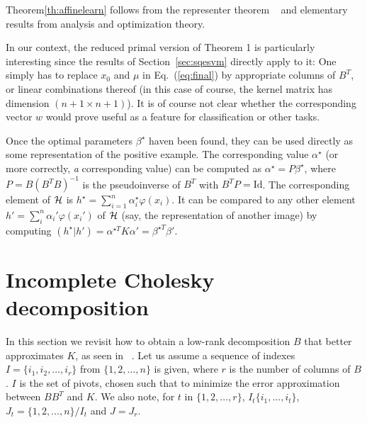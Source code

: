 \documentclass[12pt,letterpaper]{article}
\begin{document}
Theorem\ref{th:affinelearn} follows from the representer theorem
~\cite{SHS01,Wahba90} and elementary results from analysis and
optimization theory.

In our context, the reduced primal version of Theorem 1 is
particularly interesting since the results of Section~\ref{sec:sqesvm}
directly apply to it: One simply has to replace $x_0$ and $\mu$ in
Eq.~(\ref{eq:final}) by appropriate columns of $B^T$, or linear
combinations thereof (in this case of course, the kernel matrix has
dimension $(n+1\times n+1)$).  It is of course not clear whether the
corresponding vector $w$ would prove useful as a feature for
classification or other tasks.

Once the optimal parameters $\beta^\star$ haven been found, they can
be used directly as some representation of the positive example.  The
corresponding value $\alpha^\star$ (or more correctly, {\em a}
corresponding value) can be computed as $\alpha^\star =P\beta^\star$,
where $P=B(B^TB)^{-1}$ is the pseudoinverse of $B^T$ with
$B^TP=\text{Id}$. The corresponding element of $\cal H$ is
$h^\star=\sum_{i=1}^n \alpha_i^\star\varphi(x_i)$.  It can be compared
to any other element $h'=\sum_i^n\alpha_i'\varphi(x_i')$ of $\cal H$ (say, the representation of
another image) by computing $(h^\star|h')=\alpha^{\star T}K \alpha' = \beta^{\star T}\beta'$. 

\section{Incomplete Cholesky decomposition}

In this section we revisit how to obtain a low-rank decomposition $B$ that better approximates $K$, as seen in ~\cite{BaJo05,FiSc01}.
Let us assume a sequence of indexes $I=\{i_1,i_2,\dots ,i_r\}$ from $\{1,2,\dots, n\}$ is given, where $r$ is the number of columns of $B$. 
$I$ is the set of pivots, chosen such that to minimize the error approximation between $BB^T$ and $K$. We also note, for $t$ in $\{1,2,...,r\}$, $I_t\{i_1,...,i_t\}$, $J_t=\{1,2,...,n\}/ I_t$ and $J=J_r$.
\end{document}
